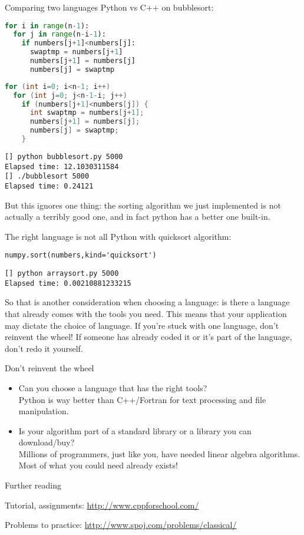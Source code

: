 \begin{block}{Comparing two languages}
  \label{sl:languages}
  Python vs C++ on bubblesort:
  \begin{multicols}{2}
    \footnotesize
\begin{lstlisting}[language=Python]
for i in range(n-1):
  for j in range(n-i-1):
    if numbers[j+1]<numbers[j]:
      swaptmp = numbers[j+1]
      numbers[j+1] = numbers[j]
      numbers[j] = swaptmp
\end{lstlisting}
    \columnbreak
\begin{lstlisting}[language=C++]
for (int i=0; i<n-1; i++)
  for (int j=0; j<n-1-i; j++)
    if (numbers[j+1]<numbers[j]) {
      int swaptmp = numbers[j+1];
      numbers[j+1] = numbers[j];
      numbers[j] = swaptmp;
    }
\end{lstlisting}
  \end{multicols}
\begin{verbatim}
[] python bubblesort.py 5000
Elapsed time: 12.1030311584
[] ./bubblesort 5000
Elapsed time: 0.24121
\end{verbatim}
\end{block}

But this ignores one thing: the sorting algorithm we just implemented
is not actually a terribly good one, and in fact python has a better
one built-in.

\begin{block}{The right language is not all}
\label{sl:quick-algo}
Python with quicksort algorithm:
\begin{verbatim}
numpy.sort(numbers,kind='quicksort')
\end{verbatim}  
\begin{verbatim}
[] python arraysort.py 5000
Elapsed time: 0.00210881233215
\end{verbatim}
\end{block}

So that is another consideration when choosing a language: is there a
language that already comes with the tools you need. This means that
your application may dictate the choice of language. If you're stuck
with one language, don't reinvent the wheel! If someone has already
coded it or it's part of the language, don't redo it yourself.

\begin{slide}{Don't reinvent the wheel}
  \label{sl:nowheel}
  \begin{itemize}
  \item Can you choose a language that has the right tools?\\
    Python is way better than C++/Fortran for text processing and file
    manipulation.
  \item Is your algorithm part of a standard library or a library you
    can download/buy?\\
    Millions of programmers, just like you, have needed linear algebra
    algorithms. Most of what you could need already exists!
  \end{itemize}
\end{slide}

 {Further reading}

Tutorial, assignments:
\url{http://www.cppforschool.com/}

Problems to practice:
\url{http://www.spoj.com/problems/classical/}
